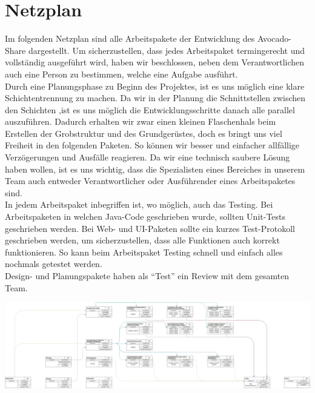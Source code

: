 \section{Netzplan}
Im folgenden Netzplan sind alle Arbeitspakete der Entwicklung des Avocado-Share dargestellt. 
Um sicherzustellen, dass jedes Arbeitspaket termingerecht und vollständig ausgeführt wird, haben wir beschlossen, neben dem Verantwortlichen auch eine Person zu bestimmen, welche eine Aufgabe ausführt.\\

Durch eine Planungsphase zu Beginn des Projektes, ist es uns möglich eine klare Schichtentrennung zu machen.
Da wir in der Planung die Schnittstellen zwischen den Schichten ,ist es uns möglich die Entwicklungsschritte danach
alle parallel auszuführen. Dadurch erhalten wir zwar einen kleinen Flaschenhals beim Erstellen der Grobstruktur und des
Grundgerüstes, doch es bringt uns viel Freiheit in den folgenden Paketen. So können wir besser und einfacher allfällige
Verzögerungen und Ausfälle reagieren.
Da wir eine technisch saubere Lösung haben wollen, ist es uns wichtig, dass die Spezialisten eines Bereiches in unserem Team auch entweder Verantwortlicher oder Ausführender eines Arbeitspaketes sind. \\

In jedem Arbeitspaket inbegriffen ist, wo möglich, auch das Testing.
Bei Arbeitspaketen in welchen Java-Code geschrieben wurde, sollten Unit-Tests geschrieben werden.
Bei Web- und UI-Paketen sollte ein kurzes Test-Protokoll geschrieben werden, um sicherzustellen, dass alle Funktionen auch korrekt funktionieren.
So kann beim Arbeitspaket Testing schnell und einfach alles nochmals getestet werden.\\

Design- und Planungspakete haben als "`Test"' ein Review mit dem gesamten Team.

\begin{landscape}
\vspace*{\fill}
\includegraphics[width=\linewidth-1cm]{graphics/netzplan.jpg}
\vspace*{\fill}
\end{landscape}